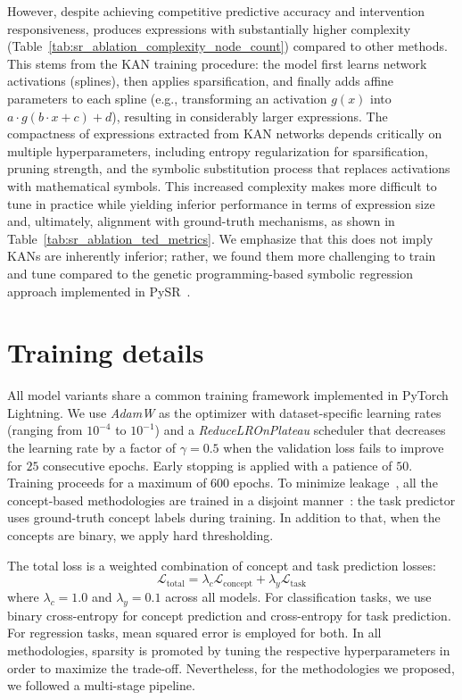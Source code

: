 \documentclass{article}
\theoremstyle{plain}
\theoremstyle{definition}
\theoremstyle{remark}
\begin{document}
However, despite achieving competitive predictive accuracy and intervention responsiveness, \kan{} produces expressions with substantially higher complexity (Table~\ref{tab:sr_ablation_complexity_node_count}) compared to other methods. This stems from the KAN training procedure: the model first learns network activations (splines), then applies sparsification, and finally adds affine parameters to each spline (e.g., transforming an activation $g(x)$ into $a \cdot g(b\cdot x + c) + d$), resulting in considerably larger expressions. The compactness of expressions extracted from KAN networks depends critically on multiple hyperparameters, including entropy regularization for sparsification, pruning strength, and the symbolic substitution process that replaces activations with mathematical symbols. This increased complexity makes \kan{} more difficult to tune in practice while yielding inferior performance in terms of expression size and, ultimately, alignment with ground-truth mechanisms, as shown in Table~\ref{tab:sr_ablation_ted_metrics}. We emphasize that this does not imply KANs are inherently inferior; rather, we found them more challenging to train and tune compared to the genetic programming-based symbolic regression approach implemented in PySR~\citep{cranmer2023interpretable}.




\section{Training details}
\label{app:training}

All model variants share a common training framework implemented in PyTorch Lightning. We use \textit{AdamW} as the optimizer with dataset-specific learning rates (ranging from $10^{-4}$ to $10^{-1}$) and a \textit{ReduceLROnPlateau} scheduler that decreases the learning rate by a factor of $\gamma = 0.5$ when the validation loss fails to improve for $25$ consecutive epochs. Early stopping is applied with a patience of $50$. Training proceeds for a maximum of $600$ epochs. To minimize leakage~\citep {marconato2022glancenets}, all the concept-based methodologies are trained in a disjoint manner~\citep{koh2020concept}: the task predictor uses ground-truth concept labels during training. In addition to that, when the concepts are binary, we apply hard thresholding.

The total loss is a weighted combination of concept and task prediction losses:
\begin{equation}
    \mathcal{L}_{\text{total}} = \lambda_c \mathcal{L}_{\text{concept}} + \lambda_y \mathcal{L}_{\text{task}}
\end{equation}
where $\lambda_c = 1.0$ and $\lambda_y = 0.1$ across all models. For classification tasks, we use binary cross-entropy for concept prediction and cross-entropy for task prediction. For regression tasks, mean squared error is employed for both. In all methodologies, sparsity is promoted by tuning the respective hyperparameters in order to maximize the \ai{} trade-off. Nevertheless, for the methodologies we proposed, we followed a multi-stage pipeline.
\end{document}
